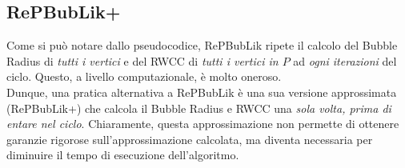\subsection{RePBubLik+}
Come si può notare dallo pseudocodice, RePBubLik ripete il calcolo del Bubble Radius di \emph{tutti i vertici}  e del RWCC di \emph{tutti i vertici in $P$} 
ad \emph{ogni iterazioni} del ciclo. Questo, a livello computazionale, è molto oneroso.\\
Dunque, una pratica alternativa a RePBubLik è una sua versione approssimata (RePBubLik+) che calcola il Bubble Radius e RWCC una \emph{sola
volta, prima di entare nel ciclo}. Chiaramente, questa approssimazione non permette di ottenere garanzie rigorose sull'approssimazione calcolata, 
ma diventa necessaria per diminuire il tempo di esecuzione dell'algoritmo.



    
